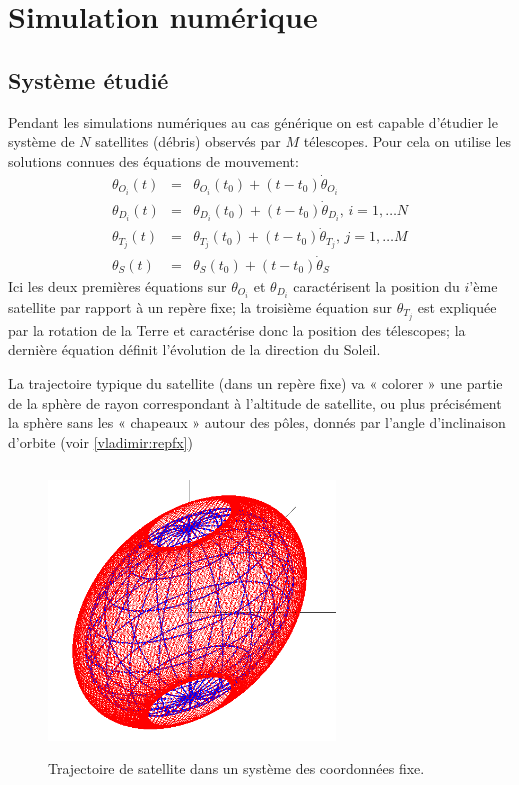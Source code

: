 
\section{Simulation num\'erique}

\subsection{Syst\`eme \'etudi\'e}
Pendant les simulations num\'eriques au cas g\'en\'erique on est capable 
d'\'etudier le syst\`eme de $N$ satellites (d\'ebris) observ\'es par $M$
t\'elescopes. Pour cela on utilise les solutions connues des \'equations 
de mouvement: 
\begin{eqnarray}
   \theta_{O_i}(t) &=& \theta_{O_i}(t_0) + (t-t_0)\dot \theta_{O_i}  \nonumber \\
   \theta_{D_i}(t) &=& \theta_{D_i}(t_0) + (t-t_0)\dot \theta_{D_i} , \, i = 1, \dots N \label{vladimir:sat} \\
   \theta_{T_j}(t) &=& \theta_{T_j}(t_0) + (t-t_0)\dot \theta_{T_j} , \, j = 1, \dots M \label{vladimir:tel} \\
   \theta_S(t) &=& \theta_S(t_0) +  (t-t_0)\dot\theta_S  \label{vladimir:sun} 
\end{eqnarray}
Ici les deux premi\`eres \'equations sur $\theta_{O_i}$ et
$\theta_{D_i}$ caract\'erisent la position du $i$'\`eme satellite par
rapport \`a un rep\`ere fixe; la troisi\`eme \'equation sur
$\theta_{T_j}$ est expliqu\'ee par la rotation de la Terre et
caract\'erise donc la position des t\'elescopes; la derni\`ere
\'equation d\'efinit l'évolution de la direction du Soleil.

La trajectoire typique du satellite (dans un rep\`ere fixe) va « colorer » une partie de
la sph\`ere de rayon correspondant \`a l'altitude de satellite, ou plus pr\'ecis\'ement la sph\`ere
sans les « chapeaux » autour des p\^oles, donn\'es par l'angle d'inclinaison d'orbite
(voir \autoref{vladimir:repfx})
 \begin{figure}[htp] \centering
     \includegraphics*[width=3in, height=3in]{repfx.png}
      \caption{
            \label{vladimir:repfx}
Trajectoire de satellite dans un syst\`eme des coordonn\'ees fixe. }
 \end{figure}

